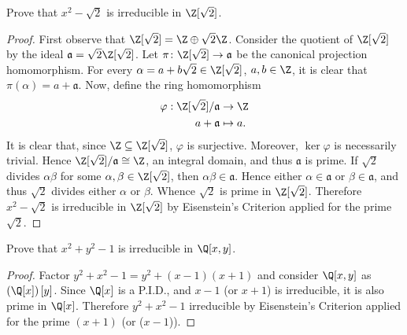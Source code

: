 \documentclass[10pt]{amsart}
\begin{document}
\begin{thm}
  Prove that $x^2 - \sqrt{2}$ is irreducible in $\Z[\sqrt{2}]$.
  \begin{proof}
    First observe that $\Z[\sqrt{2}] = \Z \oplus \sqrt{2}\Z$.
    Consider the quotient of $\Z[\sqrt{2}]$ by the ideal $\mathfrak{a} = \sqrt{2}\Z[\sqrt{2}]$.
    Let $\pi \colon \Z[\sqrt{2}] \rightarrow \mathfrak{a}$ be the canonical projection homomorphism.
    For every $\alpha = a + b\sqrt{2} \in \Z[\sqrt{2}]$, $a,b \in \Z$, it is clear that $\pi(\alpha) = a + \mathfrak{a}$.
    Now, define the ring homomorphism 
    \begin{align*}
      \varphi : \Z[\sqrt{2}]/\mathfrak{a} &\rightarrow \Z\\
      a + \mathfrak{a} &\mapsto a.
    \end{align*}
    It is clear that, since $\Z \subseteq \Z[\sqrt{2}]$, $\varphi$ is surjective.
    Moreover, $\ker\varphi$ is necessarily trivial.
    Hence $\Z[\sqrt{2}]/\mathfrak{a} \cong \Z$, an integral domain, and thus $\mathfrak{a}$ is prime.
    If $\sqrt{2}$ divides $\alpha\beta$ for some $\alpha, \beta \in \Z[\sqrt{2}]$, then $\alpha\beta \in \mathfrak{a}$.
    Hence either $\alpha \in \mathfrak{a}$ or $\beta \in \mathfrak{a}$, and thus $\sqrt{2}$ divides either $\alpha$ or $\beta$.
    Whence $\sqrt{2}$ is prime in $\Z[\sqrt{2}]$.
    Therefore $x^2 - \sqrt{2}$ is irreducible in $\Z[\sqrt{2}]$ by Eisenstein's Criterion applied for the prime $\sqrt{2}$.
  \end{proof}
\end{thm}

\begin{thm}
  Prove that $x^2 + y^2 - 1$ is irreducible in $\Q[x,y]$.
  \begin{proof}
    Factor $y^2 + x^2 - 1 = y^2 + (x-1)(x+1)$ and consider $\Q[x,y]$ as $\left(\Q[x]\right)[y]$.
    Since $\Q[x]$ is a P.I.D., and $x - 1$ (or $x + 1$) is irreducible, it is also prime in $\Q[x]$.
    Therefore $y^2 + x^2 - 1$ irreducible by Eisenstein's Criterion applied for the prime $(x + 1)$ (or ($x - 1$)).
  \end{proof}
\end{thm}
\end{document}

